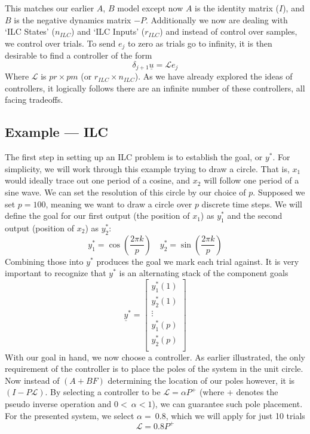 This matches our earlier $A$, $B$ model except now $A$ is the identity matrix ($I$), and $B$ is the negative dynamics matrix $-P$. Additionally we now are dealing with `ILC States' ($n_{ILC}$) and `ILC Inputs' ($r_{ILC}$) and instead of control over samples, we control over trials. To send $e_j$ to zero as trials go to infinity, it is then desirable to find a controller of the form
\begin{equation}
    \delta_{j+1}\underline{u}=\mathcal{L}e_j
    \label{eq:del_u_L_e_j}
\end{equation}
Where $\mathcal{L}$ is $pr\times pm$ (or $r_{ILC} \times n_{ILC}$). As we have already explored the ideas of controllers, it logically follows there are an infinite number of these controllers, all facing tradeoffs. 

\FloatBarrier\subsection{Example --- ILC} %
The first step in setting up an ILC problem is to establish the goal, or $y^\ast$. For simplicity, we will work through this example trying to draw a circle. That is, $x_1$ would ideally trace out one period of a cosine, and $x_2$ will follow one period of a sine wave. We can set the resolution of this circle by our choice of $p$.
Supposed we set $p=100$, meaning we want to draw a circle over $p$ discrete time steps. We will define the goal for our first output (the position of $x_1$) as $y_1^\ast$ and the second output (position of $x_2$) as $y_2^\ast$:
\begin{equation}
    y_1^\ast=\cos\left(\frac{2\pi k}{p}\right)
    \quad
    y_2^\ast=\sin\left(\frac{2\pi k}{p}\right)
    \label{eq:y1_y2_star}
\end{equation}
Combining those into $y^\ast$ produces the goal we mark each trial against. It is very important to recognize that $y^\ast$ is an alternating stack of the component goals
\begin{equation}
    {\underline{y}}^\ast=\left[\begin{matrix}y_1^\ast\left(1\right)\\y_2^\ast\left(1\right)\\\vdots\\y_1^\ast\left(p\right)\\y_2^\ast\left(p\right)\\\end{matrix}\right]
    \label{eq:stacked_y_star}
\end{equation}
With our goal in hand, we now choose a controller. As earlier illustrated, the only requirement of the controller is to place the poles of the system in the unit circle. Now instead of $\left(A+BF\right)$ determining the location of our poles however, it is $\left(I-P\mathcal{L}\right)$. By selecting a controller to be $\mathcal{L}=\alpha P^+$ (where + denotes the pseudo inverse operation and $0<\ \alpha<1$), we can guarantee such pole placement. For the presented system, we select $\alpha=\ 0.8$, which we will apply for just 10 trials
\begin{equation}
    \mathcal{L} = 0.8P^+
    \label{eq:ilc_controller}
\end{equation}

